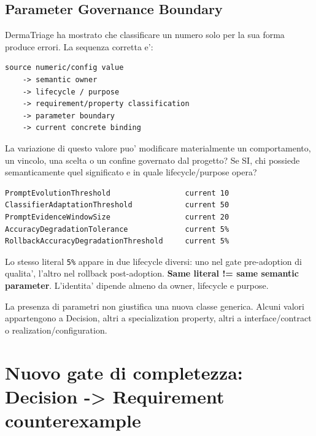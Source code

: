 \documentclass[11pt,a4paper]{article}
\begin{document}
\subsection{Parameter Governance Boundary}
\holdouttag

DermaTriage ha mostrato che classificare un numero solo per la sua forma produce errori. La sequenza corretta e':

\begin{lstlisting}
source numeric/config value
    -> semantic owner
    -> lifecycle / purpose
    -> requirement/property classification
    -> parameter boundary
    -> current concrete binding
\end{lstlisting}

\begin{ddtacheck}[title={Domanda fondamentale per un parametro}]
La variazione di questo valore puo' modificare materialmente un comportamento, un vincolo, una scelta o un confine governato dal progetto? Se SI, chi possiede semanticamente quel significato e in quale lifecycle/purpose opera?
\end{ddtacheck}

\begin{ddtaexample}[title={DermaTriage - cinque ruoli diversi}]
\begin{lstlisting}
PromptEvolutionThreshold                 current 10
ClassifierAdaptationThreshold            current 50
PromptEvidenceWindowSize                 current 20
AccuracyDegradationTolerance             current 5%
RollbackAccuracyDegradationThreshold     current 5%
\end{lstlisting}
Lo stesso literal \texttt{5\%} appare in due lifecycle diversi: uno nel gate pre-adoption di qualita', l'altro nel rollback post-adoption. \textbf{Same literal != same semantic parameter}. L'identita' dipende almeno da owner, lifecycle e purpose.
\end{ddtaexample}

\begin{ddtaanti}[title={Non inventare una ConfigurationRequirement}]
La presenza di parametri non giustifica una nuova classe generica. Alcuni valori appartengono a Decision, altri a specialization property, altri a interface/contract o realization/configuration.
\end{ddtaanti}

\section{Nuovo gate di completezza: Decision -> Requirement counterexample}
\holdouttag
\end{document}
